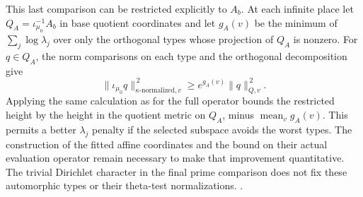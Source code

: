 This last comparison can be restricted explicitly to \(A_b\).
At each infinite place let \(Q_A=\iota_{\mu_0}^{-1}A_b\) in
base quotient coordinates and let \(g_A(v)\) be the minimum
of \(\sum_j\log\lambda_j\) over only the orthogonal types whose
projection of \(Q_A\) is nonzero. For \(q\in Q_A\), the norm
comparisons on each type and the orthogonal decomposition give
\[
 \|\iota_{\mu_0}q\|_{\kappa\text{-normalized},v}^{\,2}
       \ge e^{g_A(v)}\|q\|_{Q,v}^{\,2}.
\]
Applying the same calculation as for the full operator bounds
the restricted height by the height in the quotient metric
on \(Q_A\), minus \(\operatorname{mean}_v g_A(v)\).
This permits a better \(\lambda_j\) penalty if the selected
subspace avoids the worst types. The construction of the fitted
affine coordinates and the bound on their actual evaluation
operator remain necessary to make that improvement quantitative.
The trivial Dirichlet character in the final prime comparison
does not fix these automorphic types or their theta-test
normalizations.
.

